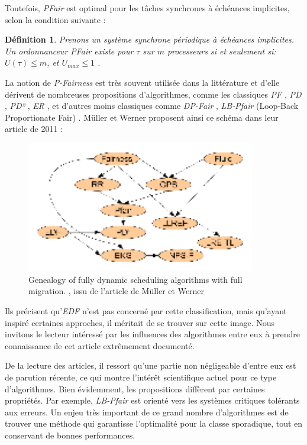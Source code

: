 \documentclass[11pt,a4paper,oneside]{report}
\newtheorem{mydef}{Définition}
\begin{document}
	Toutefois, \textit{PFair} est optimal pour les tâches synchrones à échéances implicites, selon 
	la condition suivante :\medskip
	\begin{mydef}
		Prenons un système synchrone périodique à échéances implicites. 
		Un ordonnanceur PFair existe pour $\tau$ sur $m$ processeurs si et seulement si:\medskip
		$U(\tau) \leq m$, et $U_{max} \leq 1$ \cite{baruah_proportionate_1996}.
	\end{mydef}
	
	La notion de \textit{P-Fairness} est très souvent utilisée dans la littérature et d'elle dérivent 
	de nombreuses propositions d'algorithmes, comme les classiques \textit{PF} \cite{baruah_proportionate_1996}, \textit{PD} \cite{baruah_fast_1995}, \textit{PD²} \cite{srinivasan_optimal_2006} , \textit{ER} \cite{anderson_early-release_2000}, 
	et d'autres moins \og classiques\fg{}  comme \textit{DP-Fair} \cite{levin_dp-fair_2010}, 
	\textit{LB-Pfair} (Loop-Back Proportionate Fair) \cite{kramer_proportionate_2015}. 
	Müller et Werner proposent ainsi ce schéma dans leur article de 2011 :\medskip
	\begin{figure}[ht]
		\caption{\og Genealogy of fully dynamic scheduling algorithms with full migration.\fg{} , issu de l'article de Müller et Werner\cite{muller_genealogy_2011}}
		\includegraphics[width=10cm]{img/genealogy_pf}
	\end{figure}
	Ils précisent qu'\textit{EDF} n'est pas concerné par cette classification, mais qu'ayant 
	inspiré certaines approches, il méritait de se trouver sur cette image. 
	Nous invitons le lecteur intéressé par les influences des algorithmes entre eux 
	à prendre connaissance de cet article extrêmement documenté.\medskip
	
	De la lecture des articles, il ressort qu'une partie non négligeable d'entre eux 
	est de parution récente, ce qui montre l'intérêt scientifique actuel pour ce type d'algorithmes. 
	Bien évidemment, les propositions diffèrent par certaines propriétés. Par exemple, 
	\textit{LB-Pfair} est orienté vers les systèmes critiques tolérants aux erreurs. 
	Un enjeu très important de ce grand nombre d'algorithmes est de trouver une méthode qui 
	garantisse l'optimalité pour la classe sporadique, tout en conservant de bonnes performances. 
	
\end{document}
